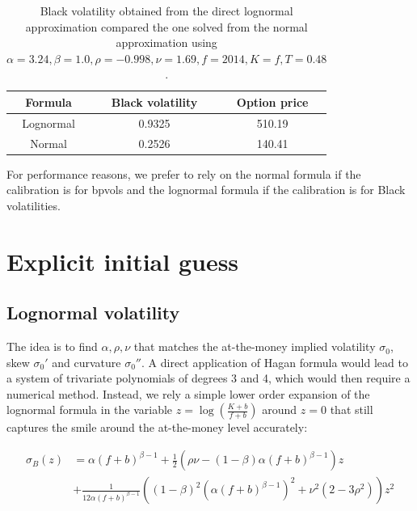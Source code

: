 \documentclass[]{rAMF2e}
\begin{document}
\begin{table}[h]
\begin{center}
\caption{\label{tbl:lognormal_high_alpha}Black volatility obtained from the direct lognormal approximation compared the one solved from the normal approximation using $\alpha=3.24,\beta=1.0,\rho=-0.998, \nu=1.69, f=2014, K=f, T=0.48$.}
\begin{tabular}{|c|c|c|}
\hline
Formula & Black volatility & Option price \\ 
\hline
Lognormal & 0.9325 & 510.19 \\
Normal & 0.2526 & 140.41 \\
\hline
\end{tabular}
\end{center}
\end{table}
For performance reasons, we prefer to rely on the normal formula if the calibration is for bpvols and the lognormal formula if the calibration is for Black volatilities.


\section{Explicit initial guess}
\subsection{Lognormal volatility}
The idea is to find $\alpha, \rho, \nu$ that matches the at-the-money implied volatility $\sigma_0$, skew $\sigma_0'$ and curvature $\sigma_0''$. A direct application of Hagan formula would lead to a system of trivariate polynomials of degrees 3 and 4, which would then require a numerical method. Instead, we rely a simple lower order expansion of the lognormal formula in the variable $z=\log\left(\frac{K+b}{f+b}\right)$ around $z=0$ that still captures the smile around the at-the-money level accurately:

\begin{align}
\sigma_B(z) &= \alpha (f+b)^{\beta-1} + \frac{1}{2}\left(\rho \nu - (1-\beta)\alpha (f+b)^{\beta-1}\right)z \nonumber\\
&+ \frac{1}{12\alpha (f+b)^{\beta-1}}\left((1-\beta)^2(\alpha (f+b)^{\beta-1})^2 + \nu^2(2-3\rho^2)\right)z^2
\end{align}
\end{document}
